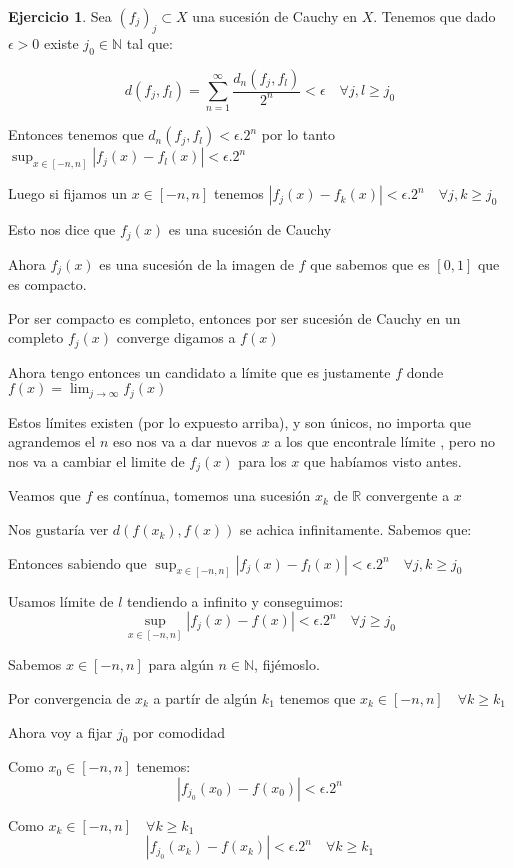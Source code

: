 \documentclass[12pt]{article}
\newcommand{\R}{\mathbb{R}}
\newcommand{\N}{\mathbb{N}}
\newcommand{\ra}{\rightarrow}
\theoremstyle{definition}
\newtheorem{ej}{Ejercicio}
\begin{document}
\begin{ej}
	Sea $(f_j)_j \subset X$ una sucesión de Cauchy en $X$. Tenemos que dado $\epsilon >0 $ existe $j_0 \in \N$ tal que:

	$$d(f_j,f_l) = \sum_{n=1}^{\infty} \frac{d_n(f_j,f_l)}{2^n} < \epsilon \quad \forall j,l \geq j_0$$

	Entonces tenemos que $d_n(f_j,f_l) < \epsilon.2^n$ por lo tanto $\sup_{x \in [-n,n]} |f_j(x)-f_l(x)| < \epsilon.2^n$

	Luego si fijamos un $x\in [-n,n]$ tenemos $|f_j(x)-f_k(x)| < \epsilon.2^n \quad \forall j,k\geq j_0 $

	Esto nos dice que $f_j(x)$ es una sucesión de Cauchy

	Ahora $f_j(x)$ es una sucesión de la imagen de $f$ que sabemos que es $[0,1]$ que es compacto.

	Por ser compacto es completo, entonces por ser sucesión de Cauchy en un completo $f_j(x)$ converge digamos a $f(x)$

	Ahora tengo entonces un candidato a límite que es justamente $f$ donde $f(x) = \lim_{j\ra\infty}f_j(x)$

	Estos límites existen (por lo expuesto arriba), y son únicos, no importa que agrandemos el $n$ eso nos va a dar nuevos $x$ a los que encontrale límite , pero no nos va a cambiar el limite de $f_j(x)$ para los $x$ que habíamos visto antes.

	Veamos que $f$ es contínua, tomemos una sucesión $x_k$ de $\R$ convergente a $x$

	Nos gustaría ver $d(f(x_k),f(x))$ se achica infinitamente. Sabemos que:

	Entonces sabiendo que $\sup_{x \in [-n,n] } |f_j(x)-f_l(x)| <\epsilon.2^n \quad \forall j,k \geq j_0 $ 

	Usamos límite de $l$ tendiendo a infinito y conseguimos:  
	$$\sup_{x\in[-n,n]} |f_j(x) - f(x)| < \epsilon.2^n \quad \forall j\geq j_0$$
	
	Sabemos $x \in [-n,n]$ para algún $n \in \N$, fijémoslo. 

	Por convergencia de $x_k$ a partír de algún $k_1$ tenemos que $x_k \in [-n,n] \quad \forall k \geq k_1$


	Ahora voy a fijar $j_0$ por comodidad

	Como $x_0 \in [-n,n] $ tenemos:
	$$ |f_{j_0}(x_0) - f(x_0)| < \epsilon. 2^n $$

	Como  $x_k \in [-n,n]\quad \forall k\geq k_1$  
	$$|f_{j_0}(x_k)-f(x_k)| < \epsilon .2^n \quad \forall k \geq k_1$$


\end{ej}
\end{document}
